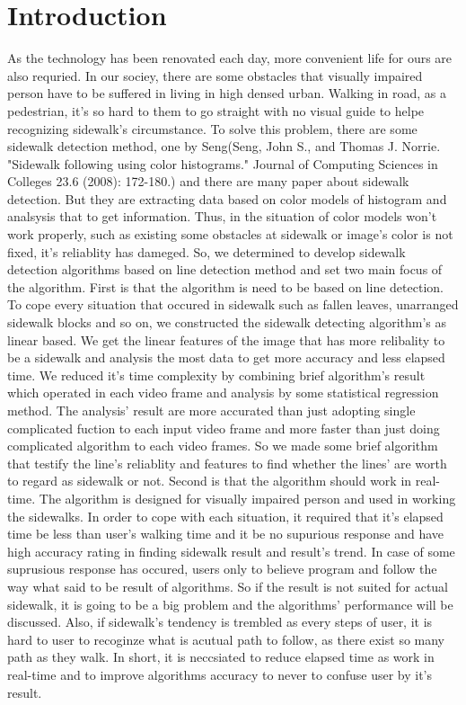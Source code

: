 \section{Introduction}
\label{sec:intro}
As the technology has been renovated each day, more convenient life for ours are also requried. In our sociey, there are some obstacles that visually impaired person have to be suffered in living in high densed urban. Walking in road, as a pedestrian, it's so hard to them to go straight with no visual guide to helpe recognizing sidewalk's circumstance. To solve this problem, there are some sidewalk detection method, one by Seng(Seng, John S., and Thomas J. Norrie. "Sidewalk following using color histograms." Journal of Computing Sciences in Colleges 23.6 (2008): 172-180.) and there are many paper about sidewalk detection. But they are extracting data based on color models of histogram and analsysis that to get information. Thus, in the situation of color models won't work properly, such as existing some obstacles at sidewalk or image's color is not fixed, it's reliablity has dameged. So, we determined to develop sidewalk detection algorithms based on line detection method and set two main focus of the algorithm. 
\newline First is that the algorithm is need to be based on line detection. To cope every situation that occured in sidewalk such as fallen leaves, unarranged sidewalk blocks and so on, we constructed the sidewalk detecting algorithm's as linear based. We get the linear features of the image that has more relibality to be a sidewalk and analysis the most data to get more accuracy and less elapsed time. We reduced it's time complexity by combining brief algorithm's result which operated in each video frame and analysis by some statistical regression method. The analysis' result are more accurated than just adopting single complicated fuction to each input video frame and more faster than just doing complicated algorithm to each video frames. So we made some brief algorithm that testify the line's reliablity and features to find whether the lines' are worth to regard as sidewalk or not. 
\newline 
Second is that the algorithm should work in real-time. The algorithm is designed for visually impaired person and used in working the sidewalks. In order to cope with each situation, it required that it's elapsed time be less than user's walking time and it be no supurious response and have high accuracy rating in finding sidewalk result and result's trend. In case of some suprusious response has occured, users only to believe program and follow the way what said to be result of algorithms. So if the result is not suited for actual sidewalk, it is going to be a big problem and the algorithms' performance will be discussed. Also, if sidewalk's tendency is trembled as every steps of user, it is hard to user to recoginze what is acutual path to follow, as there exist so many path as they walk. In short, it is neccsiated to reduce elapsed time as work in real-time and to improve algorithms accuracy to never to confuse user by it's result. 
